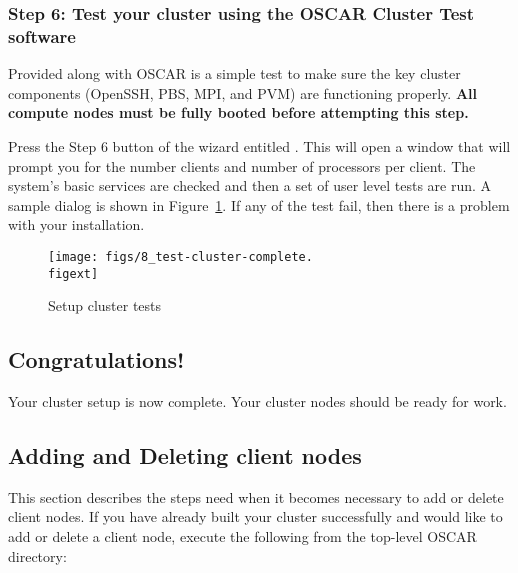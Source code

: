 \subsubsection{Step 6: Test your cluster using the OSCAR Cluster Test
  software}
\label{det:testcluster}
            
Provided along with OSCAR is a simple test to make sure the key
cluster components (OpenSSH, PBS, MPI, and PVM) are functioning
properly.  {\bf All compute nodes must be fully booted before
  attempting this step.}

Press the Step 6 button of the wizard entitled . This will open a window that will prompt you for the number
clients and number of processors per client. The system's basic
services are checked and then a set of user level tests are run. A
sample dialog is shown in Figure~\ref{fig:detailed-setup-test}. If any
of the test fail, then there is a problem with your installation.

\begin{figure}[htbp]
  \begin{center}
    \texttt{[image: figs/8\_test-cluster-complete.\\figext]}
    \caption{Setup cluster tests}
    \label{fig:detailed-setup-test}
  \end{center}
\end{figure}


\subsection{Congratulations!}

Your cluster setup is now complete. Your cluster nodes should
be ready for work.


\subsection{Adding and Deleting client nodes}

This section describes the steps need when it becomes necessary to add
or delete client nodes. If you have already built your cluster
successfully and would like to add or delete a client node, execute
the following from the top-level OSCAR directory:

